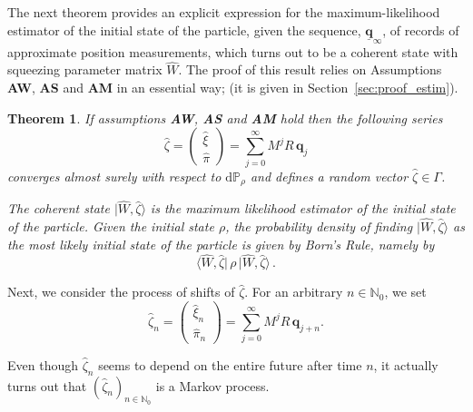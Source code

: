 \documentclass[11pt]{article}
\newtheorem{theorem}{Theorem}[section]
\newcommand{\ket}[1]{|{#1}\rangle}
\renewcommand{\d}{{\mathrm d}}
\begin{document}
The next theorem provides an explicit expression for the maximum-likelihood estimator of the initial state of the particle, given the sequence, $\underline{\mathbf q}_\infty$, of records of approximate position measurements, which turns out to be a coherent state with squeezing parameter matrix $\widehat{W}$.
The proof of this result relies on Assumptions {\bf{AW}}, {\bf{AS}} and {\bf{AM}} in an essential way; (it is given in Section~\ref{sec:proof_estim}).

\begin{theorem}\label{estimation} 
If assumptions {\bf{AW}}, {\bf{AS}} and {\bf{AM}} hold then the following series 
\begin{equation}\label{MLE}
\widehat{\zeta} = \left( \begin{array}{c}
\widehat{\xi} \\
\widehat{\pi}
\end{array}
\right) = \sum_{j=0}^\infty M^{j} R \,\mathbf{q}_j
\end{equation}
converges almost surely with respect to $\d\mathbb{P}_\rho$ and defines a random vector $\widehat{\zeta}\in \Gamma$.

The coherent state $\ket{\widehat{W}, \widehat{\zeta}}$ is the maximum likelihood estimator 
of the initial state of the particle. Given the initial state $\rho$, the probability density of finding $\ket{\widehat{W}, \widehat{\zeta}}$
as the most likely initial state  of the particle is given by Born's Rule, namely by 
$$\langle \widehat{W}, \widehat{\zeta}\vert\,\rho\, \vert \widehat{W}, \widehat{\zeta}\rangle\,.$$

\end{theorem}

Next, we consider the process of shifts of $\widehat{\zeta}$. For an arbitrary $n\in \mathbb N_0$, we set
\begin{equation}\label{MLEn}
\widehat{\zeta}_n = \left( \begin{array}{c}
\widehat{\xi}_n \\
\widehat{\pi}_n
\end{array}
\right) = \sum_{j=0}^\infty M^{j} R\, \mathbf q_{j+n}.
\end{equation}

Even though $\widehat{\zeta}_n$ seems to depend on the entire future after time $n$, it actually turns out that
$(\widehat{\zeta}_n)_{n\in \mathbb N_0}$ is a Markov process.
\end{document}
